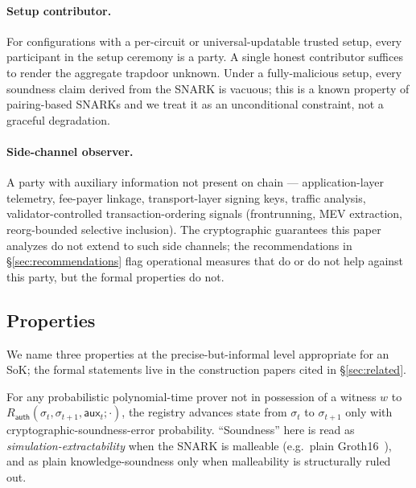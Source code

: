 \paragraph{Setup contributor.} For configurations with a per-circuit
or universal-updatable trusted setup, every participant in the setup
ceremony is a party. A single honest contributor suffices to render
the aggregate trapdoor unknown. Under a fully-malicious setup, every
soundness claim derived from the SNARK is vacuous; this is a known
property of pairing-based SNARKs and we treat it as an unconditional
constraint, not a graceful degradation.

\paragraph{Side-channel observer.} A party with auxiliary information
not present on chain --- application-layer telemetry, fee-payer
linkage, transport-layer signing keys, traffic analysis,
validator-controlled transaction-ordering signals (frontrunning,
MEV extraction, reorg-bounded selective inclusion). The cryptographic
guarantees this paper analyzes do not extend to such side channels;
the recommendations in \S\ref{sec:recommendations} flag operational
measures that do or do not help against this party, but the formal
properties do not.

\subsection{Properties}

We name three properties at the precise-but-informal level appropriate
for an SoK; the formal statements live in the construction papers
cited in \S\ref{sec:related}.

\begin{property}
For any probabilistic polynomial-time prover not in possession of a
witness $w$ to $R_{\mathsf{auth}}(\sigma_t, \sigma_{t+1},
\mathsf{aux}_t; \cdot)$, the registry advances state from $\sigma_t$
to $\sigma_{t+1}$ only with cryptographic-soundness-error
probability. ``Soundness'' here is read as
\emph{simulation-extractability} when the SNARK is malleable (e.g.\
plain Groth16~\cite{groth-2016-onpairing}), and as plain
knowledge-soundness only when malleability is structurally ruled out.
\end{property}

